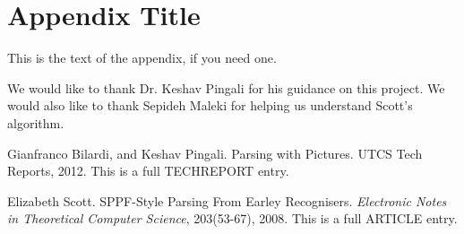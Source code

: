 \documentclass{sigplanconf}
\begin{document}
\appendix
\section{Appendix Title}

This is the text of the appendix, if you need one.

\acks
We would like to thank Dr. Keshav Pingali for his guidance on this project. We would also like to thank Sepideh Maleki for helping us understand Scott's algorithm.





\begin{thebibliography}{}
\softraggedright

Gianfranco Bilardi, and Keshav Pingali. Parsing with Pictures. UTCS Tech Reports, 2012. This is a full TECHREPORT entry.

Elizabeth Scott. SPPF-Style Parsing From Earley Recognisers. \textit{Electronic Notes in Theoretical Computer Science}, 203(53-67), 2008. This is a full ARTICLE entry.

\end{thebibliography}
\end{document}

